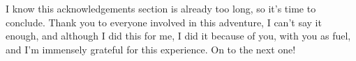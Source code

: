 I know this acknowledgements section is already too long, so it's time to conclude. Thank you to everyone involved in this adventure, I can't say it enough, and although I did this for me, I did it because of you, with you as fuel, and I'm immensely grateful for this experience. On to the next one!

%
